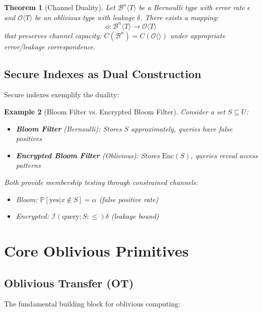 \documentclass[11pt,final,hidelinks]{article}
\newtheorem{theorem}{Theorem}[section]
\newtheorem{example}[theorem]{Example}
\newcommand{\Oblivious}[1]{\mathcal{O}\langle #1 \rangle}
\newcommand{\MutualInfo}[2]{\mathcal{I}(#1; #2)}
\newcommand{\Prob}[1]{\mathbb{P}\left[#1\right]}
\begin{document}
\begin{theorem}[Channel Duality]
Let $\mathcal{B}^n\langle T \rangle$ be a Bernoulli type with error rate $\epsilon$ and $\Oblivious{T}$ be an oblivious type with leakage $\delta$. There exists a mapping:
\begin{equation}
\phi: \mathcal{B}^n\langle T \rangle \to \Oblivious{T}
\end{equation}
that preserves channel capacity: $C(\mathcal{B}^n) = C(\Oblivious{})$ under appropriate error/leakage correspondence.
\end{theorem}

\subsection{Secure Indexes as Dual Construction}

Secure indexes exemplify the duality:

\begin{example}[Bloom Filter vs. Encrypted Bloom Filter]
Consider a set $S \subseteq U$:
\begin{itemize}
    \item \textbf{Bloom Filter} (Bernoulli): Stores $S$ approximately, queries have false positives
    \item \textbf{Encrypted Bloom Filter} (Oblivious): Stores $\text{Enc}(S)$, queries reveal access patterns
\end{itemize}

Both provide membership testing through constrained channels:
\begin{itemize}
    \item Bloom: $\Prob{\text{yes}|x \notin S} = \alpha$ (false positive rate)
    \item Encrypted: $\MutualInfo{\text{query}; S} \leq \delta$ (leakage bound)
\end{itemize}
\end{example}

\section{Core Oblivious Primitives}

\subsection{Oblivious Transfer (OT)}

The fundamental building block for oblivious computing:
\end{document}
